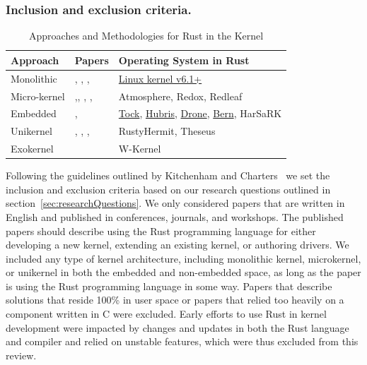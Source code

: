 \documentclass[sigconf]{acmart}
\begin{document}
\subsubsection{\textbf{Inclusion and exclusion criteria.}}

\begin{table}
    \caption{Approaches and Methodologies for Rust in the Kernel}
    \begin{tabular}{||l|l|l||}
    \hline
    Approach & Papers & Operating System in Rust\\
    \hline\hline
    Monolithic  & \cite{The_kernel_development_community_undated-iw}, \cite{Li2019-ru}, \cite{Miller2021-pg}, \cite{Oikawa2023-ms} & \href{https://docs.kernel.org/rust/}{Linux kernel v6.1+}\\
    Micro-kernel & \cite{Chen2023-wb},\cite{Liang2021-bo}, \cite{Liu2024-xe}, \cite{Narayanan2020-gs}, \cite{Narayanan2019-fd} & Atmosphere, Redox, Redleaf\\
    Embedded & \cite{Culic2022-bk}, \cite{Vishnunaryan2022-yd} & \href{https://github.com/tock/tock}{Tock}, \href{https://hubris.oxide.computer/}{Hubris}, \href{https://www.drone-os.com/}{Drone}, \href{https://bern-rtos.org/}{Bern}, HarSaRK \\
    Unikernel & \cite{Lankes2019-cm},  \cite{Boos2020-zh}, \cite{Ijaz2023-da}, \cite{Sung2020-bb}  & RustyHermit, Theseus \\
    Exokernel & \cite{Li2024-yb} & W-Kernel \\
    \hline
  \end{tabular}
  \label{tab:RQ1}
\end{table}

Following the guidelines outlined by Kitchenham and Charters~\cite{Stuart2007-cc} we set the
inclusion and exclusion criteria based on our research questions outlined in
section~\ref{sec:researchQuestions}. We only considered papers that are written in English and published
in conferences, journals, and workshops. The published papers should
describe using the Rust programming language for either developing a new kernel, extending an
existing kernel, or authoring drivers. We included any type of kernel architecture, including
monolithic kernel, microkernel, or unikernel in both the embedded and non-embedded space, as long as
the paper is using the Rust programming language in some way. Papers that describe solutions that
reside 100\% in user space or papers that relied too heavily on a component written in C were excluded. Early efforts to use Rust in kernel development
were impacted by changes and updates in both the Rust language and compiler and relied on unstable
features, which were thus excluded from this review.
\end{document}

